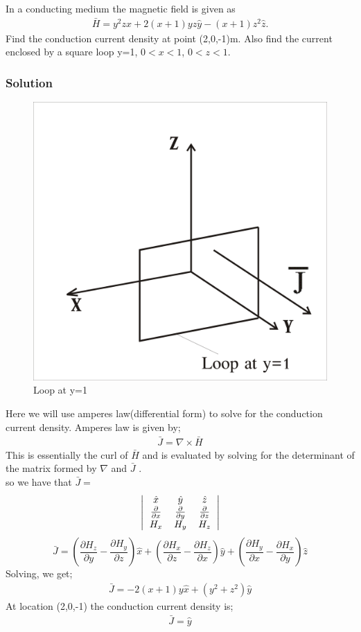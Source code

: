 \begin{example}
In a conducting medium the magnetic field is given as
\begin{align*}
\bar{H}=y^{2}z\hat{x}+2(x+1)yz\hat{y}-(x+1)z^{2}\hat{z}.
\end{align*}
Find the conduction current density at point (2,0,-1)m. Also find the current enclosed by a square loop y=1,  $0<x<1$, $0<z<1$.
\subsubsection*{Solution}
\begin{figure}[h]
\centering
\includegraphics[width=.5\linewidth]{./graphics/problem3b}
\caption{Loop at y=1}
\end{figure} 

Here we will use amperes law(differential form) to solve for the conduction current density. Amperes law is given by;
\begin{align*}
\bar{J}=\nabla\times\bar{H}
\end{align*}
This is essentially the curl of $\bar{H}$ and is evaluated by solving for the determinant of the matrix formed by $\nabla$ and $\bar{J}$ .\\
so we have that $\bar{J} =$
\[
\left|
\begin{tabular}{c c c}
$\hat{x}$ & $\hat{y}$ & $\hat{z}$\\
$\frac{\partial}{\partial x}$ &  $\frac{\partial}{\partial y}$ &  $\frac{\partial}{\partial z}$\\
$H_{x}$ & $H_{y}$ & $H_{z}$
\end{tabular}
\right|
\]
\begin{dmath*}
\bar{J}= (\frac{\partial H_{z}}{\partial y}-\frac{\partial H_{y}}{\partial z})\hat{x}+ (\frac{\partial H_{x}}{\partial z}-\frac{\partial H_{z}}{\partial x})\hat{y}+ (\frac{\partial H_{y}}{\partial x}-\frac{\partial H_{x}}{\partial y})\hat{z}
\end{dmath*}
Solving, we get;
\begin{align*}
\bar{J}=-2(x+1)y\hat{x}+(y^{2}+z^{2})\hat{y}
\end{align*}
At location (2,0,-1) the conduction current density is;
\begin{align*}
\bar{J}=\hat{y}
\end{align*}


\end{example}
